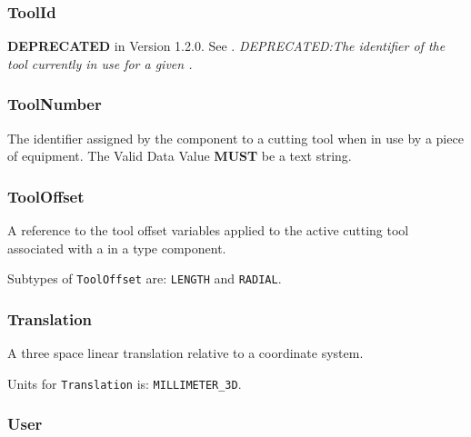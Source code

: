 \subsubsection{ToolId}
  \label{sec:ToolId}



\textbf{DEPRECATED} in Version 1.2.0.   See . \textit{DEPRECATED:The identifier of the tool currently in use for a given .}

\FloatBarrier

\subsubsection{ToolNumber}
  \label{sec:ToolNumber}



The identifier assigned by the  component to a cutting tool when in use by a piece of equipment. 
 The \gls{Valid Data Value} \textbf{MUST} be a text string.

\FloatBarrier

\subsubsection{ToolOffset}
  \label{sec:ToolOffset}



A reference to the tool offset variables applied to the active cutting tool associated with a  in a  type component.


Subtypes of \texttt{ToolOffset} are: \texttt{LENGTH} and \texttt{RADIAL}. 
\FloatBarrier

\subsubsection{Translation}
  \label{sec:Translation}



A three space linear translation relative to a coordinate system.



Units for \texttt{Translation} is: \texttt{MILLIMETER_3D}.

\FloatBarrier

\subsubsection{User}
  \label{sec:User}



